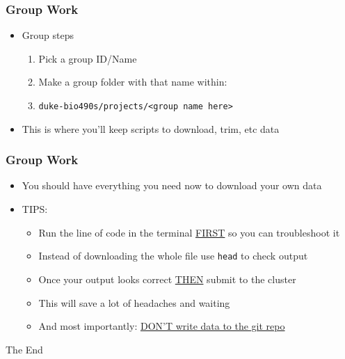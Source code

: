 \documentclass[14pt]{beamer}
\begin{document}
\begin{frame}
\frametitle{Group Work}
\begin{itemize}
	\item[] Group steps
	\begin{enumerate}
		\item Pick a group ID/Name
		\item Make a group folder with that name within:
		\item \texttt{duke-bio490s/projects/<group name here>}
	\end{enumerate}
	\item This is where you'll keep scripts to download, trim, etc data
\end{itemize}
\end{frame}

\begin{frame}
\frametitle{Group Work}
\begin{itemize}
	\item<+-> You should have everything you need now to download your own data
	\item<+-> TIPS:
	\begin{itemize}
		\item<+-> Run the line of code in the terminal \underline{FIRST} so you can troubleshoot it
		\item<+-> Instead of downloading the whole file use \texttt{head} to check output  
		\item<+-> Once your output looks correct \underline{THEN} submit to the cluster
		\item<+-> This will save a lot of headaches and waiting
		\item<+-> And most importantly: \underline{DON'T write data to the git repo}
	\end{itemize}
\end{itemize}
\end{frame}

\begin{frame}
\Huge{\centerline{The End}}
\end{frame}

\end{document}
